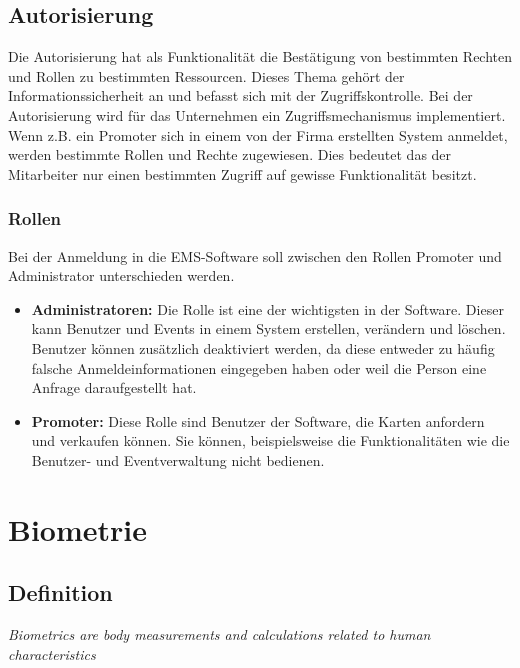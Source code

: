 \subsection{Autorisierung}
Die Autorisierung hat als Funktionalität die Bestätigung von bestimmten Rechten und Rollen zu bestimmten Ressourcen. Dieses Thema gehört der Informationssicherheit an und befasst sich mit der Zugriffskontrolle. Bei der Autorisierung wird für das Unternehmen ein Zugriffsmechanismus implementiert. Wenn z.B. ein Promoter sich in einem von der Firma erstellten System anmeldet, werden bestimmte Rollen und Rechte zugewiesen. Dies bedeutet das der Mitarbeiter nur einen bestimmten Zugriff auf gewisse Funktionalität besitzt.

\subsubsection{Rollen}
Bei der Anmeldung in die EMS-Software soll zwischen den Rollen Promoter und Administrator unterschieden werden. 
\begin{itemize}
	\item \textbf{Administratoren:} Die Rolle ist eine der wichtigsten in der Software. Dieser kann Benutzer und Events in einem System erstellen, verändern und löschen. Benutzer können zusätzlich deaktiviert werden, da diese entweder zu häufig falsche Anmeldeinformationen eingegeben haben oder weil die Person eine Anfrage daraufgestellt hat.
	\item \textbf{Promoter:} Diese Rolle sind Benutzer der Software, die Karten anfordern und verkaufen können. Sie können, beispielsweise die Funktionalitäten wie die Benutzer- und Eventverwaltung nicht bedienen.
\end{itemize}

\section{Biometrie}
\subsection{Definition}
\begin{center}
	\textit{Biometrics are body measurements and calculations related to human characteristics}
\end{center}

